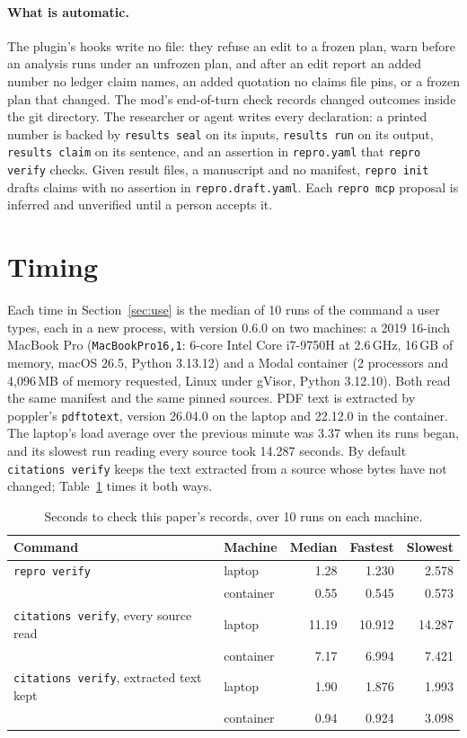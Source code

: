 \documentclass{article}
\newcommand{\code}[1]{\texttt{#1}}
\newcommand{\reproverify}{\code{repro verify}}
\begin{document}
\paragraph{What is automatic.} The plugin's hooks write no file: they refuse an edit to a frozen
plan, warn before an analysis runs under an unfrozen plan, and after an edit report an added number
no ledger claim names, an added quotation no claims file pins, or a frozen plan that changed. The
mod's end-of-turn check records changed outcomes inside the git directory. The researcher or agent
writes every declaration: a printed number is backed by \code{results seal} on its inputs,
\code{results run} on its output, \code{results claim} on its sentence, and an assertion in
\code{repro.yaml} that \code{repro verify} checks. Given result files, a manuscript and no manifest,
\code{repro init} drafts claims with no assertion in \code{repro.draft.yaml}. Each \code{repro mcp}
proposal is inferred and unverified until a person accepts it.

\section{Timing}
\label{sec:timing}

Each time in Section~\ref{sec:use} is the median of 10 runs of the command a user types, each in a
new process, with version 0.6.0 on two machines: a 2019 16-inch MacBook Pro (\code{MacBookPro16,1}:
6-core Intel Core i7-9750H at 2.6\,GHz, 16\,GB of memory, macOS 26.5, Python 3.13.12) and a
Modal container (2 processors and 4{,}096\,MB of memory requested, Linux under gVisor, Python
3.12.10). Both read the same manifest and the same pinned sources. PDF text is extracted by poppler's
\code{pdftotext}, version 26.04.0 on the laptop and 22.12.0 in the container. The laptop's load average over
the previous minute was 3.37 when its runs began, and its slowest run reading every source took
14.287 seconds. By default \code{citations verify} keeps the text extracted from a source whose
bytes have not changed; Table~\ref{tab:timing-paper} times it both ways.

\vspace{0.5em}
\begin{table}[H]
\centering
\small
\caption{Seconds to check this paper's records, over 10 runs on each machine.}
\label{tab:timing-paper}
\begin{tabular}{@{}llrrr@{}}
\toprule
\textbf{Command} & \textbf{Machine} & \textbf{Median} & \textbf{Fastest} & \textbf{Slowest} \\
\midrule
\reproverify{} & laptop & 1.28 & 1.230 & 2.578 \\
 & container & 0.55 & 0.545 & 0.573 \\
\midrule
\code{citations verify}, every source read & laptop & 11.19 & 10.912 & 14.287 \\
 & container & 7.17 & 6.994 & 7.421 \\
\midrule
\code{citations verify}, extracted text kept & laptop & 1.90 & 1.876 & 1.993 \\
 & container & 0.94 & 0.924 & 3.098 \\
\bottomrule
\end{tabular}
\end{table}
\end{document}
